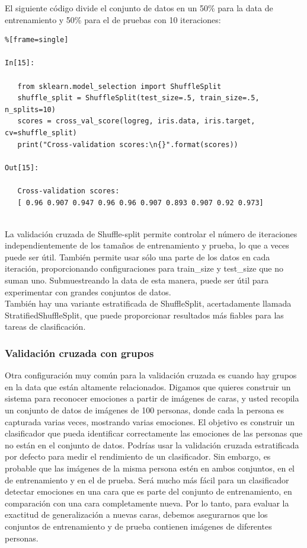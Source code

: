El siguiente código divide el conjunto de datos en un 50\% para la data de entrenamiento y 
 50\% para el de pruebas con 10 iteraciones:


\begin{lstlisting}%[frame=single]

In[15]:

   from sklearn.model_selection import ShuffleSplit
   shuffle_split = ShuffleSplit(test_size=.5, train_size=.5, n_splits=10)
   scores = cross_val_score(logreg, iris.data, iris.target, cv=shuffle_split)
   print("Cross-validation scores:\n{}".format(scores))
   
Out[15]:

   Cross-validation scores:
   [ 0.96 0.907 0.947 0.96 0.96 0.907 0.893 0.907 0.92 0.973]
  
\end{lstlisting}

La validación cruzada de Shuffle-split permite controlar el número de iteraciones independientemente de los tamaños de entrenamiento y prueba, lo que a veces puede ser útil. También permite usar sólo una parte de los datos en cada iteración, proporcionando configuraciones para {\ttfamily train\_size}  y  {\ttfamily test\_size} que no suman uno.  Submuestreando la data de esta manera, puede ser útil para experimentar con grandes conjuntos de datos.\\

 También hay una variante estratificada de {\ttfamily  ShuffleSplit}, acertadamente llamada {\ttfamily  StratifiedShuffleSplit}, que puede proporcionar resultados más fiables para las tareas de clasificación.



\subsubsection{Validación cruzada con grupos}



Otra configuración muy común para la validación cruzada es cuando hay grupos en la
data que están altamente relacionados. Digamos que quieres construir un sistema para reconocer emociones
a partir de imágenes de caras, y usted recopila un conjunto de datos de imágenes de 100 personas, donde cada
la persona es capturada varias veces, mostrando varias emociones. El objetivo es construir un
clasificador que pueda identificar correctamente las emociones de las personas que no están en el conjunto de datos.  Podrías usar la validación cruzada estratificada por defecto para medir el rendimiento de un clasificador. Sin embargo, es probable que las imágenes de la misma persona estén en ambos conjuntos, en el de entrenamiento y en el de prueba. Será mucho más fácil para un clasificador detectar emociones en una cara que es parte del conjunto de entrenamiento, en comparación con una cara completamente nueva.   Por lo tanto,  para evaluar la exactitud de generalización a nuevas caras,  debemos asegurarnos  que  los conjuntos de  entrenamiento y de prueba contienen imágenes de diferentes personas.\\

